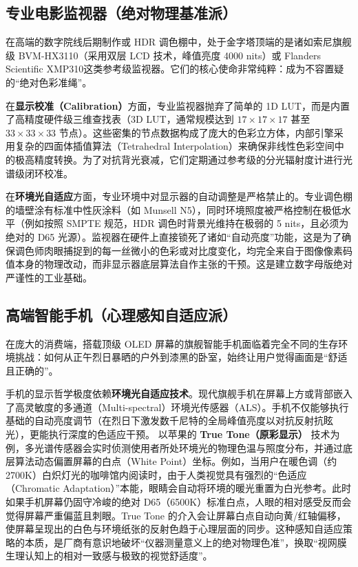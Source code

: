 \documentclass[12pt, a4paper]{ctexart}
\begin{document}
\subsection{专业电影监视器（绝对物理基准派）}
在高端的数字院线后期制作或 HDR 调色棚中，处于金字塔顶端的是诸如索尼旗舰级 BVM-HX3110（采用双层 LCD 技术，峰值亮度 4000 nits）或 Flanders Scientific XMP310这类参考级监视器。它们的核心使命非常纯粹：成为不容置疑的“绝对色彩准绳”。

在\textbf{显示校准（Calibration）}方面，专业监视器抛弃了简单的 1D LUT，而是内置了高精度硬件级三维查找表（3D LUT，通常规模达到 $17 \times 17 \times 17$ 甚至 $33 \times 33 \times 33$ 节点）。这些密集的节点数据构成了庞大的色彩立方体，内部引擎采用复杂的四面体插值算法（Tetrahedral Interpolation）来确保非线性色彩空间中的极高精度转换。为了对抗背光衰减，它们定期通过参考级的分光辐射度计进行光谱级闭环校准。

在\textbf{环境光自适应}方面，专业环境中对显示器的自动调整是严格禁止的。专业调色棚的墙壁涂有标准中性灰涂料（如 Munsell N5），同时环境照度被严格控制在极低水平（例如按照 SMPTE 规范，HDR 调色时背景光维持在极弱的 5 nits，且必须为绝对的 D65 光源）。监视器在硬件上直接锁死了诸如“自动亮度”功能，这是为了确保调色师肉眼捕捉到的每一丝微小的色彩或对比度变化，均完全来自于图像像素码值本身的物理改动，而非显示器底层算法自作主张的干预。这是建立数字母版绝对严谨性的工业基础。

\subsection{高端智能手机（心理感知自适应派）}
在庞大的消费端，搭载顶级 OLED 屏幕的旗舰智能手机面临着完全不同的生存环境挑战：如何从正午烈日暴晒的户外到漆黑的卧室，始终让用户觉得画面是“舒适且正确的”。

手机的显示哲学极度依赖\textbf{环境光自适应技术}。现代旗舰手机在屏幕上方或背部嵌入了高灵敏度的多通道（Multi-spectral）环境光传感器（ALS）。手机不仅能够执行基础的自动亮度调节（在烈日下激发数千尼特的全局峰值亮度以对抗反射抗眩光），更能执行深度的色适应干预。
以苹果的 \textbf{True Tone（原彩显示）} 技术为例，多光谱传感器会实时侦测使用者所处环境光的物理色温与照度分布，并通过底层算法动态偏置屏幕的白点（White Point）坐标。例如，当用户在暖色调（约 2700K）白炽灯光的咖啡馆内阅读时，由于人类视觉具有强烈的“色适应（Chromatic Adaptation）”本能，眼睛会自动将环境的暖光重置为白光参考。此时如果手机屏幕仍固守冷峻的绝对 D65（6500K）标准白点，人眼的相对感受反而会觉得屏幕严重偏蓝且刺眼。True Tone 的介入会让屏幕白点自动向黄/红轴偏移，使屏幕呈现出的白色与环境纸张的反射色趋于心理层面的同步。这种感知自适应策略的本质，是厂商有意识地破坏“仪器测量意义上的绝对物理色准”，换取“视网膜生理认知上的相对一致感与极致的视觉舒适度”。
\end{document}

